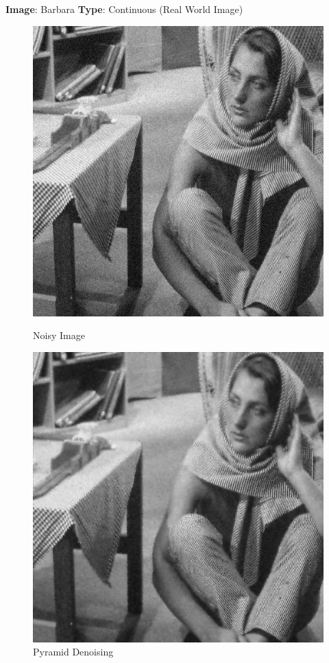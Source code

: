 \documentclass{article}
\begin{document}
    \textbf{Image}: Barbara  \textbf{Type}: Continuous (Real World Image)\\

    \begin{figure}[!htb]
      \includegraphics[scale=0.4]{./denoising/b/b05.png}
      \caption{Noisy Image}
    \endminipage \hfill
      \includegraphics[scale=.4]{./denoising/b/p_1_0_013.png}
      \caption{Pyramid Denoising}
    \endminipage
    \end{figure}\\
    
\end{document}
